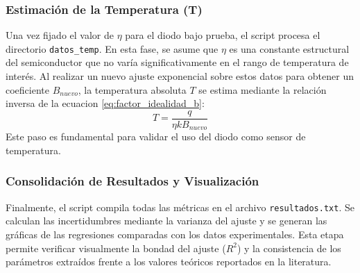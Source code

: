 \documentclass[conference]{IEEEtran}
\begin{document}
\subsubsection{Estimación de la Temperatura (T)}
Una vez fijado el valor de $\eta$ para el diodo bajo prueba, el script procesa el directorio \texttt{datos\_temp}. En esta fase, se asume que $\eta$ es una constante estructural del semiconductor que no varía significativamente en el rango de temperatura de interés. Al realizar un nuevo ajuste exponencial sobre estos datos para obtener un coeficiente $B_{nuevo}$, la temperatura absoluta $T$ se estima mediante la relación inversa de la ecuacion \ref{eq:factor_idealidad_b}:
\begin{equation}
    T = \frac{q}{\eta k B_{nuevo}}
\end{equation}
Este paso es fundamental para validar el uso del diodo como sensor de temperatura.

\subsubsection{Consolidación de Resultados y Visualización}
Finalmente, el script compila todas las métricas en el archivo \texttt{resultados.txt}. Se calculan las incertidumbres mediante la varianza del ajuste y se generan las gráficas de las regresiones comparadas con los datos experimentales. Esta etapa permite verificar visualmente la bondad del ajuste ($R^2$) y la consistencia de los parámetros extraídos frente a los valores teóricos reportados en la literatura.
\end{document}
